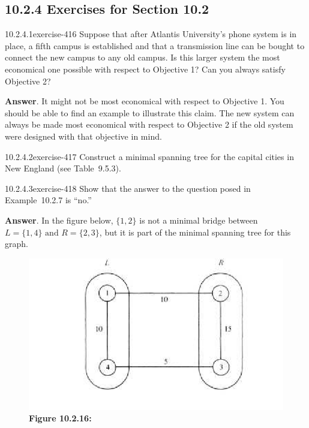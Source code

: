 \documentclass[twoside,10pt,]{book}
\numberwithin{equation}{section}
\begin{document}
\subsection*{10.2.4 Exercises for Section 10.2}
\begin{divisionsolution}{10.2.4.1}{}{exercise-416}%
\hypertarget{p-3597}{}%
Suppose that after Atlantis University's phone system is in place, a fifth campus is established and that a transmission line can be bought to connect the new campus to any old campus. Is this larger system the most economical one possible with respect to Objective 1? Can you always satisfy Objective 2?%
\par\smallskip%
\noindent\textbf{Answer}.\quad%
\hypertarget{p-3598}{}%
It might not be most economical with respect to Objective 1. You should be able to find an example to illustrate this claim. The new system can always be made most economical with respect to Objective 2 if the old system were designed with that objective in mind.%
\end{divisionsolution}%
\begin{divisionsolution}{10.2.4.2}{}{exercise-417}%
\hypertarget{p-3599}{}%
Construct a minimal spanning tree for the capital cities in New England (see Table~9.5.3).%
\end{divisionsolution}%
\begin{divisionsolution}{10.2.4.3}{}{exercise-418}%
\hypertarget{p-3600}{}%
Show that the answer to the question posed in Example~10.2.7 is ``no.''%
\par\smallskip%
\noindent\textbf{Answer}.\quad%
\hypertarget{p-3601}{}%
In the figure below, \(\{1,2\}\) is not a minimal bridge between \(L=\{1,4\} \textrm{ and } R=\{2,3\}\), but it is part of the minimal spanning tree for this graph.%
\begin{figure}
\centering
\includegraphics[width=0.8\linewidth]{images/fig-sol-e-10-2-3.png}
\caption*{\textbf{Figure 10.2.16:} }
\end{figure}
\end{divisionsolution}%
\end{document}
